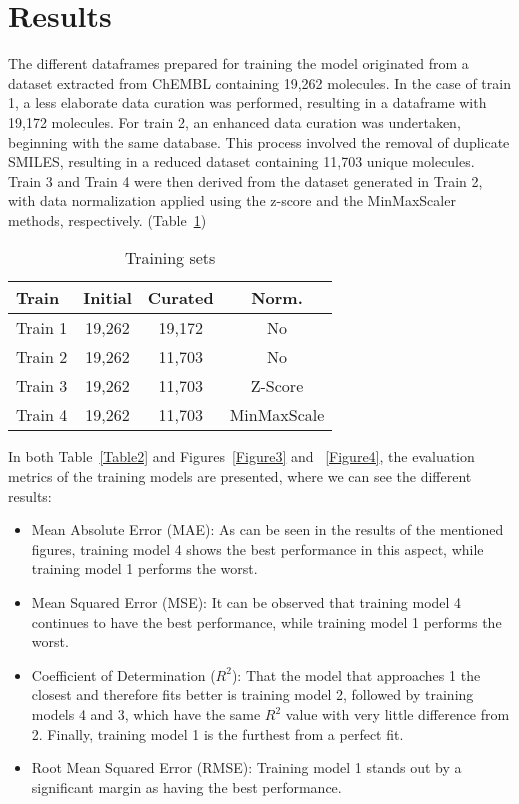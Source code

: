 \documentclass[final,times,twocolumn,article]{elsarticle}
\begin{document}
\section{Results}

The different dataframes prepared for training the model originated from a dataset extracted from ChEMBL containing 19,262 molecules. In the case of train 1, a less elaborate data curation was performed, resulting in a dataframe with 19,172 molecules. For train 2, an enhanced data curation was undertaken, beginning with the same database. This process involved the removal of duplicate SMILES, resulting in a reduced dataset containing 11,703 unique molecules. Train 3 and Train 4 were then derived from the dataset generated in Train 2, with data normalization applied using the z-score and the MinMaxScaler methods, respectively. (Table~\ref{Table1})

\begin{table}[ht]
\centering
\begin{tabular}{l c c c} 
     \hline
     Train & Initial & Curated & Norm.\\ 
     \hline
     Train 1 & 19,262 & 19,172 & No\\
     \hline
     Train 2 & 19,262 & 11,703 & No \\
     \hline
     Train 3 & 19,262 & 11,703 & Z-Score\\ 
     \hline
     Train 4 & 19,262 & 11,703 & MinMaxScale\\ 
     \hline
    \end{tabular}
\caption{Training sets}
\label{Table1}
\end{table}

In both Table~\ref{Table2} and Figures~\ref{Figure3} and ~\ref{Figure4}, the evaluation metrics of the training models are presented, where we can see the different results: 

\begin{itemize}
\item Mean Absolute Error (MAE): As can be seen in the results of the mentioned figures, training model 4 shows the best performance in this aspect, while training model 1 performs the worst.
\item Mean Squared Error (MSE): It can be observed that training model 4 continues to have the best performance, while training model 1 performs the worst.
\item Coefficient of Determination ($R^2$): That the model that approaches 1 the closest and therefore fits better is training model 2, followed by training models 4 and 3, which have the same $R^2$ value with very little difference from 2. Finally, training model 1 is the furthest from a perfect fit.
\item Root Mean Squared Error (RMSE): Training model 1 stands out by a significant margin as having the best performance.
\end{itemize}
\end{document}
